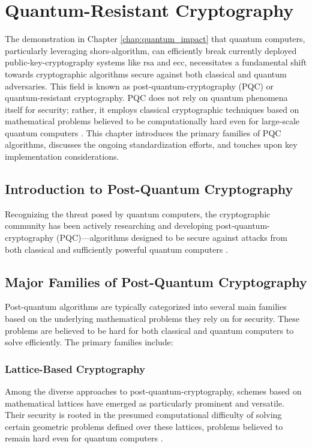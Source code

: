 \chapter{Quantum-Resistant Cryptography}\label{chap:quantum_resistant}

The demonstration in Chapter \ref{chap:quantum_impact} that quantum computers, particularly leveraging \gls{shors-algorithm}, can efficiently break currently deployed \gls{public-key-cryptography} systems like \gls{rsa} and \gls{ecc}, necessitates a fundamental shift towards cryptographic algorithms secure against both classical and quantum adversaries. This field is known as \gls{post-quantum-cryptography} (PQC) or quantum-resistant cryptography. PQC does not rely on quantum phenomena itself for security; rather, it employs classical cryptographic techniques based on mathematical problems believed to be computationally hard even for large-scale quantum computers \parencite{bernstein2017post}. This chapter introduces the primary families of PQC algorithms, discusses the ongoing standardization efforts, and touches upon key implementation considerations.

\section{Introduction to Post-Quantum Cryptography}\label{chap:pqc_overview}
Recognizing the threat posed by quantum computers, the cryptographic community has been actively researching and developing \gls{post-quantum-cryptography} (PQC)---algorithms designed to be secure against attacks from both classical and sufficiently powerful quantum computers \parencite{bernstein2017post}.

\section{Major Families of Post-Quantum Cryptography}\label{sec:pqc_categories_ch5}
Post-quantum algorithms are typically categorized into several main families based on the underlying mathematical problems they rely on for security. These problems are believed to be hard for both classical and quantum computers to solve efficiently. The primary families include:

\subsection{Lattice-Based Cryptography}\label{subsec:lattice_ch6}\label{subsec:lattice_ch5}
Among the diverse approaches to \gls{post-quantum-cryptography}, schemes based on mathematical lattices have emerged as particularly prominent and versatile. Their security is rooted in the presumed computational difficulty of solving certain geometric problems defined over these lattices, problems believed to remain hard even for quantum computers \parencite{bernstein2017post}.

